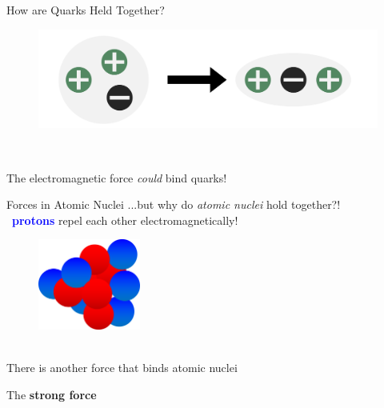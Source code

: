 \begin{frame}{How are Quarks Held Together?}  
    \begin{figure}[htb]
        \includegraphics[width=1\textwidth]{Figures Introductory Lecture/Standard Model/StrongForce_EM.png}
        \label{fig:strong_force_1}
    \end{figure} \\
    \Large \begin{center}
        The electromagnetic force \emph{could} bind quarks!
    \end{center}
\end{frame}
\begin{frame}{Forces in Atomic Nuclei}
...but why do \emph{atomic nuclei} hold together?!\\ \, \hspace{2cm}  \textcolor{blue}{\textbf{protons}} repel each other electromagnetically!

    \begin{figure}[htb]
        \includegraphics[width=0.3\textwidth]{Figures Introductory Lecture/Standard Model/Nukleus.png}
        \label{fig:strong_force_2}
    \end{figure}\\ \pause
     There is another force that binds atomic nuclei\\ 
    \vspace{0.5cm}\begin{center}
    \Large{The \textbf{strong force}}
    \end{center}
\end{frame}
